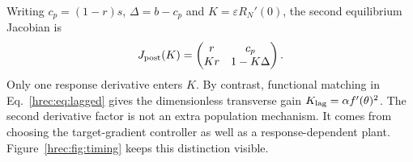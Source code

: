Writing \(c_p=(1-r)s\), \(\Delta=b-c_p\) and \(K=\varepsilon R_N'(0)\), the second equilibrium Jacobian is
\begin{equation}
 J_{\rm post}(K)=
 \begin{pmatrix}r&c_p\\Kr&1-K\Delta\end{pmatrix}.
 \label{hrec:eq:post-jacobian}
\end{equation}
Only one response derivative enters \(K\). By contrast, functional matching in Eq.~\eqref{hrec:eq:lagged} gives the dimensionless transverse gain \(K_{\rm lag}=\alpha f'(\theta)^2\). The second derivative factor is not an extra population mechanism. It comes from choosing the target-gradient controller as well as a response-dependent plant. Figure~\ref{hrec:fig:timing} keeps this distinction visible.

